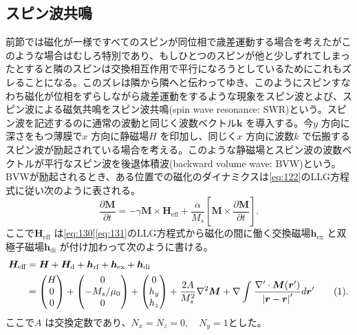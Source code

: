 \documentclass[dvipdfmx]{jsreport}
\numberwithin{equation}{chapter}
\numberwithin{table}{chapter}
\begin{document}
\subsection{スピン波共鳴}
前節では磁化が一様ですべてのスピンが同位相で歳差運動する場合を考えたがこのような場合はむしろ特別であり、もしひとつのスピンが他と少しずれてしまったとすると隣のスピンは交換相互作用で平行になろうとしているためにこれもズレることになる。このズレは隣から隣へと伝わってゆき、このようにスピンすなわち磁化が位相をずらしながら歳差運動をするような現象をスピン波とよび、スピン波による磁気共鳴をスピン波共鳴(spin wave resonance: SWR)という。スピン波を記述するのに通常の波動と同じく波数ベクトル$\bm{k}$ を導入する。今$y$ 方向に深さをもつ薄膜で$x$ 方向に静磁場$H$ を印加し、同じく$x$ 方向に波数$k$ で伝搬するスピン波が励起されている場合を考える。このような静磁場とスピン波の波数ベクトルが平行なスピン波を後退体積波(backward volume wave: BVW)という。
BVWが励起されるとき、ある位置での磁化のダイナミクスは\eqref{eq:122}のLLG方程式に従い次のように表される。
\begin{equation}
\label{eq:148}
	\frac{\partial \bm{M}}{\partial t} =-\gamma \bm{M}\times \bm{H}_\text{eff} +\frac{\alpha}{M_s}\left[ \bm{M}\times \frac{\partial \bm{M}}{\partial t}  \right] 
.\end{equation}
ここで$\bm{H}_\text{eff} $ は\eqref{eq:130}\eqref{eq:131}のLLG方程式から磁化の間に働く交換磁場$\bm{h}_\text{ex} $ と双極子磁場$\bm{h}_\text{di} $ が付け加わって次のように書ける。
\begin{align*}
\label{eq:149}
	\bm{H}_\text{eff} &=\bm{H}+\bm{H}_\text{d} +\bm{h}_\text{rf} +\bm{h}_\text{ex} +\bm{h}_\text{di}\\
					  &=\begin{pmatrix} H\\0\\0 \end{pmatrix} +\begin{pmatrix} 0\\-M_s /\mu_0\\0 \end{pmatrix} +\begin{pmatrix} 0 \\ h_y \\h_z \end{pmatrix} +\frac{2A}{M_s^2}\nabla ^2\bm{M}+\nabla \int_{}^{} \frac{\nabla '\cdot \bm{M}(\bm{r}')}{\abs{\bm{r}-\bm{r}}'}d\bm{r}'
					  \stepcounter{equation}\tag{\theequation} 
.\end{align*}
ここで$A$ は交換定数であり、$N_x=N_z=0,\quad N_y=1$とした。
\end{document}
